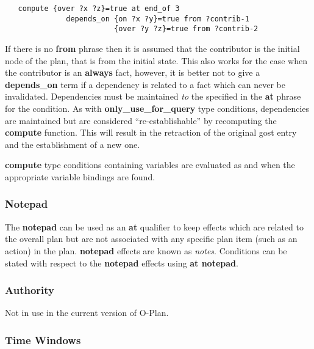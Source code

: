 \begin{verbatim}
   compute {over ?x ?z}=true at end_of 3
              depends_on {on ?x ?y}=true from ?contrib-1
                         {over ?y ?z}=true from ?contrib-2
\end{verbatim}

If there is no
{\bf from} phrase then it is assumed that the contributor is the initial
node of the plan, that is from the initial state.  This also works for
the case when the contributor is an {\bf always} fact, however, it is
better not to give a {\bf depends\_on} term if a dependency is related
to a fact which can never be invalidated.  Dependencies must be
maintained {\em to} the  specified in the {\bf at} phrase
for the condition.  As with {\bf only\_use\_for\_query} type conditions,
dependencies are maintained but are considered ``re-establishable'' by
recomputing the {\bf compute} function.  This will result in the
retraction of the original {\sc gost} entry and the establishment of a
new one. 

{\bf compute} type conditions containing variables are
evaluated as and when the appropriate variable bindings are found. 

\subsubsection{Notepad}

The {\bf notepad} can be used as an {\bf at} qualifier to keep effects which
are related to the overall plan but are not associated with any specific plan
item (such as an action) in the plan.  {\bf notepad} effects are known as {\em
notes}.  Conditions can be stated with respect to the {\bf notepad} effects
using {\bf at notepad}.

\subsubsection{Authority}

Not in use in the current version of O-Plan.

\subsubsection{Time Windows}

